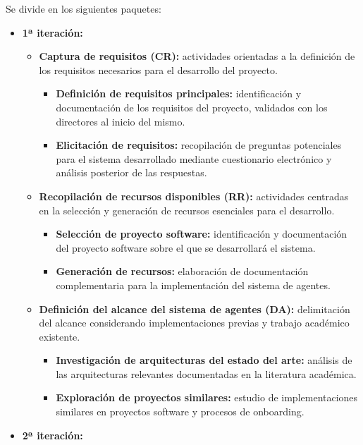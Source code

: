 Se divide en los siguientes paquetes:

\begin{itemize}
  \item\textbf{1ª iteración:}
    \begin{itemize}
      \item\textbf{Captura de requisitos (CR):} actividades orientadas a la definición de los requisitos necesarios para el desarrollo del proyecto.
            \begin{itemize}
          \item\textbf{Definición de requisitos principales:} identificación y documentación de los requisitos del proyecto, validados con los directores al inicio del mismo.
          \item\textbf{Elicitación de requisitos:} recopilación de preguntas potenciales para el sistema desarrollado mediante cuestionario electrónico y análisis posterior de las respuestas.
        \end{itemize}
      \item\textbf{Recopilación de recursos disponibles (RR):} actividades centradas en la selección y generación de recursos esenciales para el desarrollo.
        \begin{itemize}
          \item\textbf{Selección de proyecto software:} identificación y documentación del proyecto software sobre el que se desarrollará el sistema.
          \item\textbf{Generación de recursos:} elaboración de documentación complementaria para la implementación del sistema de agentes.
        \end{itemize}
      \item\textbf{Definición del alcance del sistema de agentes (DA):} delimitación del alcance considerando implementaciones previas y trabajo académico existente.
    \begin{itemize}
          \item\textbf{Investigación de arquitecturas del estado del arte:} análisis de las arquitecturas relevantes documentadas en la literatura académica.
          \item\textbf{Exploración de proyectos similares:} estudio de implementaciones similares en proyectos software y procesos de onboarding.
    \end{itemize}
      \end{itemize}
  \item\textbf{2ª iteración:}
    \begin{itemize}

\end{itemize}
\end{itemize}
